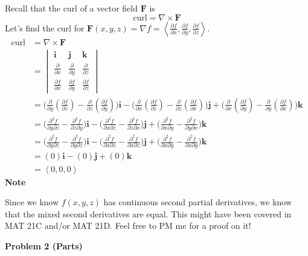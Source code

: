 \documentclass{article}
\newcommand{\lrp}[1]{\left( #1 \right)}
\newcommand{\lra}[1]{\left\langle #1 \right\rangle}
\renewcommand{\i}[0]{\mathbf{i}}
\renewcommand{\j}[0]{\mathbf{j}}
\renewcommand{\k}[0]{\mathbf{k}}
\newcommand{\F}[0]{\mathbf{F}}
\begin{document}
Recall that the curl of a vector field $\F$ is
\begin{equation*}
    \text{curl}=\nabla \times \F
\end{equation*}
Let's find the curl for $\displaystyle \F(x,y,z)=\nabla f = \lra{\frac{\partial f}{\partial x}, \frac{\partial f}{\partial y},\frac{\partial f}{\partial z}}$.
\begin{align*}
     \text{curl}&=\nabla \times \F\\ &=\begin{vmatrix}
    \i & \j & \k \\
    \frac{\partial }{\partial x} &  \frac{\partial }{\partial y} &
     \frac{\partial }{\partial z}\\
     \frac{\partial f}{\partial x} & {\frac{\partial f}{\partial y}} & {\frac{\partial f}{\partial z}}
    \end{vmatrix}\\
    &=\Bigg(\frac{\partial }{\partial y}\lrp{\frac{\partial f}{\partial z}}-\frac{\partial }{\partial z}\lrp{\frac{\partial f}{\partial y}}\Bigg)\i-\Bigg(\frac{\partial}{\partial x}\lrp{\frac{\partial f}{\partial z}}-\frac{\partial}{\partial z}\lrp{\frac{\partial f}{\partial x}}\Bigg)\j+\Bigg(\frac{\partial}{\partial x}\lrp{\frac{\partial f}{\partial y}}-\frac{\partial}{\partial y}\lrp{\frac{\partial f}{\partial x}}\Bigg)\k\\
    &=\Bigg(\frac{\partial ^2f}{\partial y\partial z}-\frac{\partial^2f}{\partial z\partial y}\Bigg)\i-\Bigg(\frac{\partial ^2f}{\partial x\partial z}-\frac{\partial^2f}{\partial z\partial x}\Bigg)\j+\Bigg(\frac{\partial ^2f}{\partial x\partial y}-\frac{\partial^2f}{\partial y\partial x}\Bigg)\k\\
    &=\Bigg(\frac{\partial ^2f}{\partial y\partial z}-\frac{\partial^2f}{\partial y\partial z}\Bigg)\i-\Bigg(\frac{\partial ^2f}{\partial x\partial z}-\frac{\partial^2f}{\partial x\partial z}\Bigg)\j+\Bigg(\frac{\partial ^2f}{\partial x\partial y}-\frac{\partial^2f}{\partial x\partial y}\Bigg)\k\tag{See Note}\\
    &=\lrp{0}\i-\lrp{0}\j+\lrp{0}\k\\
    &=\boxed{\lra{0,0,0}}
\end{align*}
\textbf{Note}

Since we know $f(x,y,z)$ has continuous second partial derivatives, we know that the mixed second derivatives are equal. This might have been covered in MAT 21C and/or MAT 21D. Feel free to PM me for a proof on it!

{}\textbf{Problem 2 (Parts)}
\end{document}
